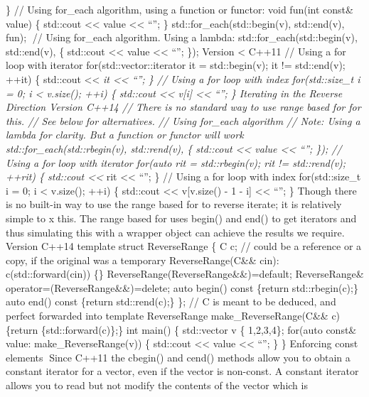 \} // Using for\_each algorithm, using a function or functor: void
fun(int const\& value) \{ std::cout \textless\textless{} value
\textless\textless{} ``\n''; \} std::for\_each(std::begin(v),
std::end(v), fun); // Using for\_each algorithm. Using a lambda:
std::for\_each(std::begin(v), std::end(v),
\href{int\%20const\&\%20value}{} \{ std::cout \textless\textless{} value
\textless\textless{} ``\n''; \}); Version \textless{} C++11 // Using a
for loop with iterator for(std::vector::iterator it = std::begin(v); it
!= std::end(v); ++it) \{ std::cout \textless\textless{} \emph{it
\textless\textless{} ``\n''; \} // Using a for loop with index
for(std::size\_t i = 0; i \textless{} v.size(); ++i) \{ std::cout
\textless\textless{} v{[}i{]} \textless\textless{} ``\n''; \} Iterating
in the Reverse Direction Version C++14 // There is no standard way to
use range based for for this. // See below for alternatives. // Using
for\_each algorithm // Note: Using a lambda for clarity. But a function
or functor will work std::for\_each(std::rbegin(v), std::rend(v),
\href{auto\%20const\&\%20value}{} \{ std::cout \textless\textless{}
value \textless\textless{} ``\n''; \}); // Using a for loop with
iterator for(auto rit = std::rbegin(v); rit != std::rend(v); ++rit) \{
std::cout \textless\textless{} }rit \textless\textless{} ``\n''; \} //
Using a for loop with index for(std::size\_t i = 0; i \textless{}
v.size(); ++i) \{ std::cout \textless\textless{} v{[}v.size() - 1 - i{]}
\textless\textless{} ``\n''; \} Though there is no built-in way to use
the range based for to reverse iterate; it is relatively simple to x
this. The range based for uses begin() and end() to get iterators and
thus simulating this with a wrapper object can achieve the results we
require. Version C++14 template struct ReverseRange \{ C c; // could be
a reference or a copy, if the original was a temporary
ReverseRange(C\&\& cin): c(std::forward(cin)) \{\}
ReverseRange(ReverseRange\&\&)=default; ReverseRange\&
operator=(ReverseRange\&\&)=delete; auto begin() const \{return
std::rbegin(c);\} auto end() const \{return std::rend(c);\} \}; // C is
meant to be deduced, and perfect forwarded into template ReverseRange
make\_ReverseRange(C\&\& c) \{return \{std::forward(c)\};\} int main()
\{ std::vector v \{ 1,2,3,4\}; for(auto const\& value:
make\_ReverseRange(v)) \{ std::cout \textless\textless{} value
\textless\textless{} ``\n''; \} \} Enforcing const elements Since C++11
the cbegin() and cend() methods allow you to obtain a constant iterator
for a vector, even if the vector is non-const. A constant iterator
allows you to read but not modify the contents of the vector which is
